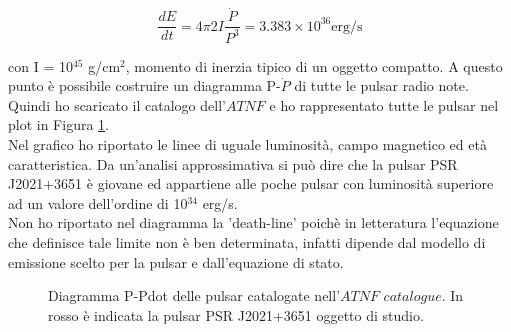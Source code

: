 \documentclass[a4paper,twocolumn]{article}
\begin{document}
\begin{large}
\begin{equation}
\frac{dE}{dt} = 4 \pi 2 I \frac{\dot{P}}{P^3} = 3.383 \times 10^{36} \mbox{erg/s}
\end{equation}

\noindent
con I = 10$^{45}$ g/cm$^2$, momento di inerzia tipico di un oggetto compatto.
A questo punto è possibile costruire un diagramma P-$\dot{P}$ di tutte le pulsar radio note. Quindi ho scaricato il catalogo dell'$\textit{ATNF}$ e ho rappresentato tutte le pulsar nel plot in Figura \ref{PPdot}.\\
Nel grafico ho riportato le linee di uguale luminosità, campo magnetico ed età caratteristica. Da un'analisi approssimativa si può dire che la pulsar PSR J2021+3651 è giovane ed appartiene alle poche pulsar con luminosità superiore ad un valore dell'ordine di 10$^{34}$ erg/s.\\
Non ho riportato nel diagramma la 'death-line' poichè in letteratura l'equazione che definisce tale limite non è ben determinata, infatti dipende dal modello di emissione scelto per la pulsar e dall'equazione di stato.


\begin{figure}[H]
    \caption{\small Diagramma P-Pdot delle pulsar catalogate nell'$\textit{ATNF catalogue}$. In rosso è indicata la pulsar PSR J2021+3651 oggetto di studio.}
    \label{PPdot}
\end{figure}



\end{large}
\end{document}
